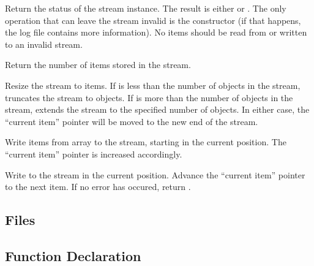      {Return the status
    of the stream instance. The result is either
     or
    . The only operation that can
    leave the stream invalid is the constructor (if that happens, the log
    file contains more information). No items should be read from or
    written to an invalid stream.}

     {Return the number of items stored in
the stream.}

     {Resize the stream to
 items. If  is less than the number of objects in the
stream,  truncates the stream to
 objects. If  is more than the
number of objects in the stream,  extends
the stream to the specified number of objects. In either
case, the ``current item'' pointer will be moved to the new end of
the stream.}

     {Write
 items from array  to the stream, starting in the
current position. The ``current item'' pointer is increased accordingly.}

     {Write  to the
stream in the current position. Advance the ``current item'' pointer to the
next item. If no error has occured, return .}
        
  \etabb
{}



\subsection{Files}
  \btabb
     {}
  \etabb

\subsection{Function Declaration}
  \btabb
     {}
  \etabb

